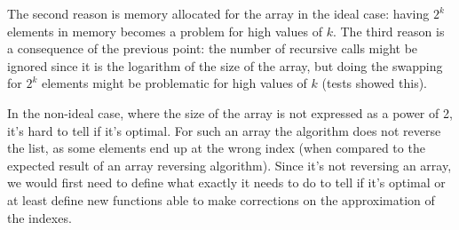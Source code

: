 \documentclass[12pt]{article}
\begin{document}
The second reason is memory allocated for the array in the ideal case: having $2^k$ elements in memory becomes a problem for 
high values of $k$. The third reason is a consequence of the previous point: the number of recursive calls might be ignored since it is the logarithm of the size of the array, but doing the swapping for $2^k$ elements might be problematic for high values of $k$ (tests showed this).

In the non-ideal case, where the size of the array is not expressed as a power of 2, it's hard to tell if it's optimal. For such an array the algorithm does not reverse the list, as some elements end up at the wrong index (when compared to the 
expected result of an array reversing algorithm). Since it's not reversing an array, we would first need to define what exactly 
it needs to do to tell if it's optimal or at least define new functions able to make corrections on the approximation of the indexes.
\end{document}
